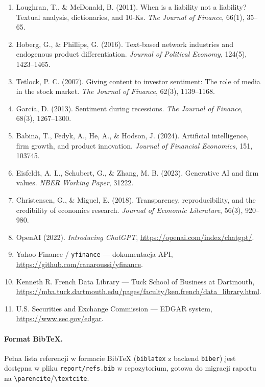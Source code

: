\documentclass[11pt,a4paper]{article}
\begin{document}
\begin{enumerate}
  \item Loughran, T., \& McDonald, B. (2011). When is a liability not a liability?
        Textual analysis, dictionaries, and 10-Ks. \emph{The Journal of Finance},
        66(1), 35--65.
  \item Hoberg, G., \& Phillips, G. (2016). Text-based network industries and
        endogenous product differentiation. \emph{Journal of Political Economy},
        124(5), 1423--1465.
  \item Tetlock, P. C. (2007). Giving content to investor sentiment: The role of
        media in the stock market. \emph{The Journal of Finance}, 62(3),
        1139--1168.
  \item Garc\'ia, D. (2013). Sentiment during recessions.
        \emph{The Journal of Finance}, 68(3), 1267--1300.

  \item Babina, T., Fedyk, A., He, A., \& Hodson, J. (2024). Artificial
        intelligence, firm growth, and product innovation. \emph{Journal of
        Financial Economics}, 151, 103745.
  \item Eisfeldt, A. L., Schubert, G., \& Zhang, M. B. (2023). Generative AI
        and firm values. \emph{NBER Working Paper}, 31222.

  \item Christensen, G., \& Miguel, E. (2018). Transparency, reproducibility,
        and the credibility of economics research. \emph{Journal of Economic
        Literature}, 56(3), 920--980.

  \item OpenAI (2022). \emph{Introducing ChatGPT},
        \url{https://openai.com/index/chatgpt/}.
  \item Yahoo Finance / \texttt{yfinance} --- dokumentacja API,
        \url{https://github.com/ranaroussi/yfinance}.
  \item Kenneth R. French Data Library --- Tuck School of Business at Dartmouth,
        \url{https://mba.tuck.dartmouth.edu/pages/faculty/ken.french/data_library.html}.
  \item U.S. Securities and Exchange Commission --- EDGAR system,
        \url{https://www.sec.gov/edgar}.
\end{enumerate}

\paragraph{Format BibTeX.} Pełna lista referencji w formacie BibTeX
(\texttt{biblatex} z backend \texttt{biber}) jest dostępna w pliku
\texttt{report/refs.bib} w repozytorium, gotowa do migracji raportu na
\texttt{\textbackslash parencite}/\texttt{\textbackslash textcite}.
\end{document}
